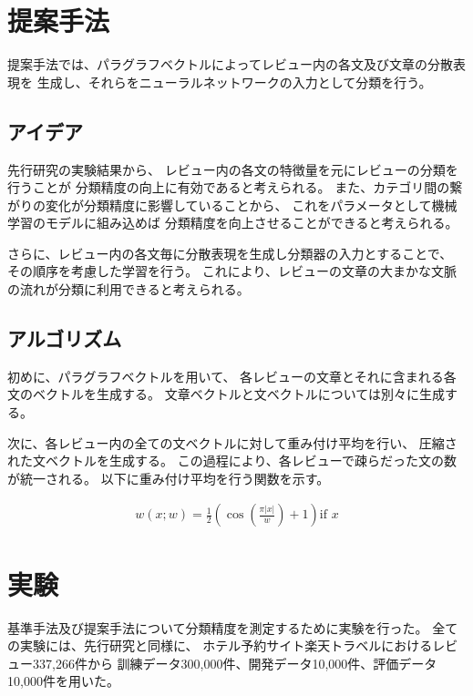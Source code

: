 \documentclass[11pt,a4paper]{ltjsarticle}
\begin{document}
\section{提案手法}\label{ux63d0ux6848ux624bux6cd5}

提案手法では、パラグラフベクトルによってレビュー内の各文及び文章の分散表現を
生成し、それらをニューラルネットワークの入力として分類を行う。

\subsection{アイデア}\label{ux30a2ux30a4ux30c7ux30a2}

先行研究\cite{fujitani15}の実験結果から、
レビュー内の各文の特徴量を元にレビューの分類を行うことが
分類精度の向上に有効であると考えられる。
また、カテゴリ間の繋がりの変化が分類精度に影響していることから、
これをパラメータとして機械学習のモデルに組み込めば
分類精度を向上させることができると考えられる。

さらに、レビュー内の各文毎に分散表現を生成し分類器の入力とすることで、
その順序を考慮した学習を行う。
これにより、レビューの文章の大まかな文脈の流れが分類に利用できると考えられる。

\subsection{アルゴリズム}

初めに、パラグラフベクトルを用いて、
各レビューの文章とそれに含まれる各文のベクトルを生成する。
文章ベクトルと文ベクトルについては別々に生成する。

次に、各レビュー内の全ての文ベクトルに対して重み付け平均を行い、
圧縮された文ベクトルを生成する。
この過程により、各レビューで疎らだった文の数が統一される。
以下に重み付け平均を行う関数を示す。

\begin{gather}
w(x; w) = \frac{1}{2} (\cos(\frac{\pi |x|}{w}) + 1) \text{if $x$}
\end{gather}



\section{実験}

基準手法及び提案手法について分類精度を測定するために実験を行った。
全ての実験には、先行研究\cite{fujitani15}と同様に、
ホテル予約サイト楽天トラベルにおけるレビュー337,266件から
訓練データ300,000件、開発データ10,000件、評価データ10,000件を用いた。
\end{document}

